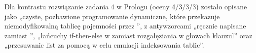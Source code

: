Dla kontrastu rozwiązanie zadania 4 w Prologu (oceny 4/3/3/3) zostało opisane jako „czyste,
pozbawione  programowanie dynamiczne, które przekazuje niemodyfikowalną tablicę
pojemności przez ”, z antywzorcami „ręcznie napisane
 zamiast ”, „łańcuchy if-then-else w  zamiast
rozgałęziania w głowach klauzul” oraz „przesuwanie list za pomocą  w celu emulacji
indeksowania tablic”.
